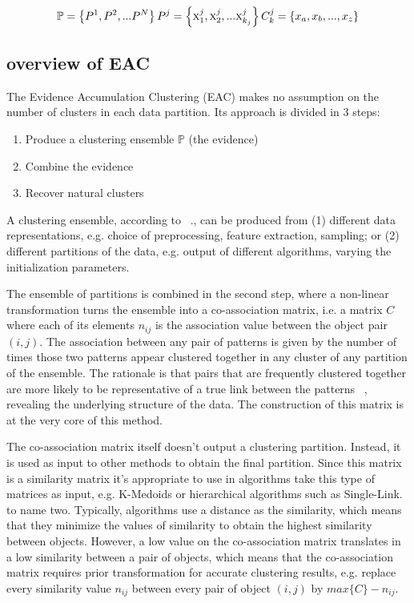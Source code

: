 $$
\mathbb{P} = \left \{   P^1, P^2, ... P^N   \right \} \\
P^j = \left \{   \textsc{x}^j_1, \textsc{x}^j_2, ... \textsc{x}^{j}_{k_j}   \right \} \\
C^j_k = \left \{   x_a, x_b, ..., x_z   \right \}
$$

\subsection{overview of EAC} 
The Evidence Accumulation Clustering (EAC) makes no assumption on the number of clusters in each data partition. Its approach is divided in 3 steps:

\begin{enumerate}
\item Produce a clustering ensemble $\mathbb{P}$ (the evidence)
\item Combine the evidence
\item Recover natural clusters 
\end{enumerate}

A clustering ensemble, according to ~\cite{Fred2005}., can be produced from (1) different data representations, e.g. choice of preprocessing, feature extraction, sampling; or (2) different partitions of the data, e.g. output of different algorithms, varying the initialization parameters.

The ensemble of partitions is combined in the second step, where a non-linear transformation turns the ensemble into a co-association matrix, i.e. a matrix $C$ where each of its elements $n_{ij}$ is the association value between the object pair $(i,j)$. The association between any pair of patterns is given by the number of times those two patterns appear clustered together in any cluster of any partition of the ensemble. The rationale is that pairs that are frequently clustered together are more likely to be representative of a true link between the patterns ~\cite{Fred2005}, revealing the underlying structure of the data.
The construction of this matrix is at the very core of this method.

The co-association matrix itself doesn't output a clustering partition. Instead, it is used as input to other methods to obtain the final partition. Since this matrix is a similarity matrix it's appropriate to use in algorithms take this type of matrices as input, e.g. K-Medoids or hierarchical algorithms such as Single-Link. to name two. Typically, algorithms use a distance as the similarity, which means that they minimize the values of similarity to obtain the highest similarity between objects. However, a low value on the co-association matrix translates in a low similarity between a pair of objects, which means that the co-association matrix requires prior transformation for accurate clustering results, e.g. replace every similarity value $n_{ij}$ between every pair of object $(i,j)$ by $max \{ C \} - n_{ij}$.


